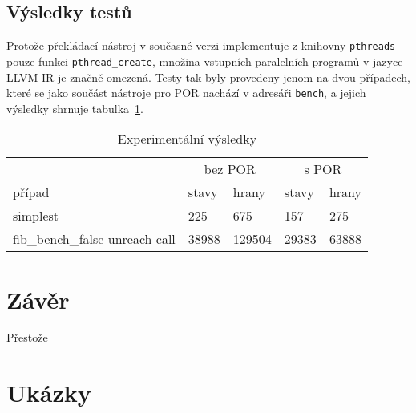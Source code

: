 \documentclass[12pt]{fithesis2}
\begin{document}
\section{Výsledky testů}
Protože překládací nástroj v současné verzi implementuje z knihovny \texttt{pthreads} pouze funkci \texttt{pthread\_create}, množina vstupních paralelních programů v jazyce LLVM IR je značně omezená. Testy tak byly provedeny jenom na dvou případech, které se jako součást nástroje pro POR nachází v adresáři \texttt{bench}, a jejich výsledky shrnuje tabulka~\ref{tbl:experimental-results}.

\begin{table}
\begin{tabular}{|l|l|l|l|l|}
\hline
&\multicolumn{2}{c|}{bez POR} & \multicolumn{2}{c|}{s POR} \\
případ & stavy & hrany & stavy & hrany \\
\hline
simplest & 225 & 675 & 157 & 275\\
fib\_bench\_false-unreach-call & 38988 & 129504 & 29383 & 63888 \\
\hline
\end{tabular}
\caption{Experimentální výsledky}
\label{tbl:experimental-results}
\end{table}

\chapter{Závěr}
Přestože 



\appendix
\chapter{Ukázky}
\end{document}
